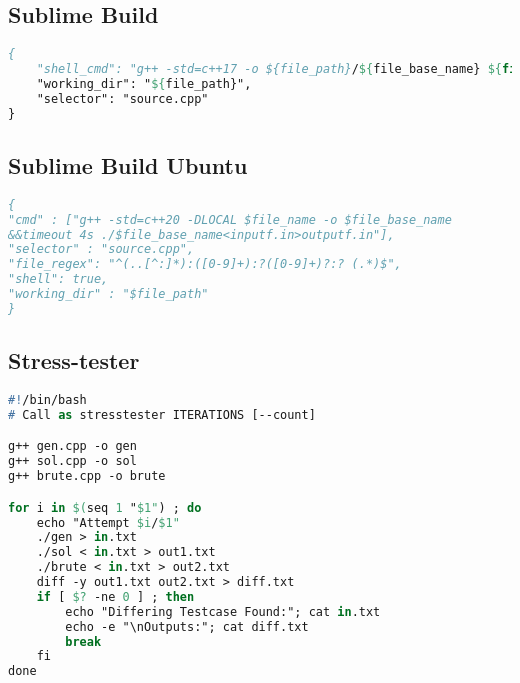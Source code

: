 \subsection*{Sublime Build}
\begin{lstlisting}[language= Pascal, commentstyle=\color{black}, numberstyle=\tiny\color{black}, keywordstyle=\color{black}, stringstyle=\color{black},
]
{
    "shell_cmd": "g++ -std=c++17 -o ${file_path}/${file_base_name} ${file} && ${file_path}/${file_base_name} < input.txt > output.txt",
    "working_dir": "${file_path}",
    "selector": "source.cpp"
}
\end{lstlisting}
\subsection*{Sublime Build Ubuntu}

\begin{lstlisting}[language= Pascal, commentstyle=\color{black}, numberstyle=\tiny\color{black}, keywordstyle=\color{black}, stringstyle=\color{black},
]
{
"cmd" : ["g++ -std=c++20 -DLOCAL $file_name -o $file_base_name 
&&timeout 4s ./$file_base_name<inputf.in>outputf.in"],
"selector" : "source.cpp",
"file_regex": "^(..[^:]*):([0-9]+):?([0-9]+)?:? (.*)$",
"shell": true,
"working_dir" : "$file_path"
}
\end{lstlisting}

\subsection*{Stress-tester}
\begin{lstlisting}[language= Pascal, commentstyle=\color{black}, numberstyle=\tiny\color{black}, keywordstyle=\color{black}, stringstyle=\color{black},
]
#!/bin/bash
# Call as stresstester ITERATIONS [--count]

g++ gen.cpp -o gen
g++ sol.cpp -o sol
g++ brute.cpp -o brute

for i in $(seq 1 "$1") ; do
    echo "Attempt $i/$1"
    ./gen > in.txt
    ./sol < in.txt > out1.txt
    ./brute < in.txt > out2.txt
    diff -y out1.txt out2.txt > diff.txt
    if [ $? -ne 0 ] ; then
        echo "Differing Testcase Found:"; cat in.txt
        echo -e "\nOutputs:"; cat diff.txt
        break
    fi
done
\end{lstlisting}

